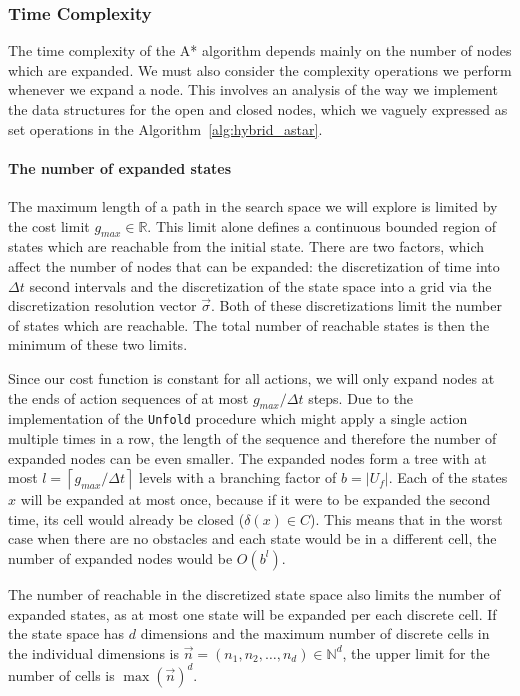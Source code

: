 \subsubsection{Time Complexity}

The time complexity of the A* algorithm depends mainly on the number of nodes which are expanded. We must also consider the complexity operations we perform whenever we expand a node. This involves an analysis of the way we implement the data structures for the open and closed nodes, which we vaguely expressed as set operations in the Algorithm~\ref{alg:hybrid_astar}.

\paragraph{The number of expanded states} The maximum length of a path in the search space we will explore is limited by the cost limit $g_{max}\in \mathbb{R}$. This limit alone defines a continuous bounded region of states which are reachable from the initial state. There are two factors, which affect the number of nodes that can be expanded: the discretization of time into $\Delta t$ second intervals and the discretization of the state space into a grid via the discretization resolution vector $\vec{\sigma}$. Both of these discretizations limit the number of states which are reachable. The total number of reachable states is then the minimum of these two limits.

Since our cost function is constant for all actions, we will only expand nodes at the ends of action sequences of at most $g_{max}/\Delta t$ steps. Due to the implementation of the \texttt{Unfold} procedure which might apply a single action multiple times in a row, the length of the sequence and therefore the number of expanded nodes can be even smaller. The expanded nodes form a tree with at most $l=\left\lceil g_{max}/\Delta t\right\rceil$ levels with a branching factor of $b=|U_f|$. Each of the states $x$ will be expanded at most once, because if it were to be expanded the second time, its cell would already be closed ($\delta(x)\in C$). This means that in the worst case when there are no obstacles and each state would be in a different cell, the number of expanded nodes would be $O(b^l)$.

The number of reachable in the discretized state space also limits the number of expanded states, as at most one state will be expanded per each discrete cell. If the state space has $d$ dimensions and the maximum number of discrete cells in the individual dimensions is $\vec{n}=\left(n_1, n_2, \ldots, n_d\right)\in \mathbb{N}^d$, the upper limit for the number of cells is $\max(\vec{n})^d$.


